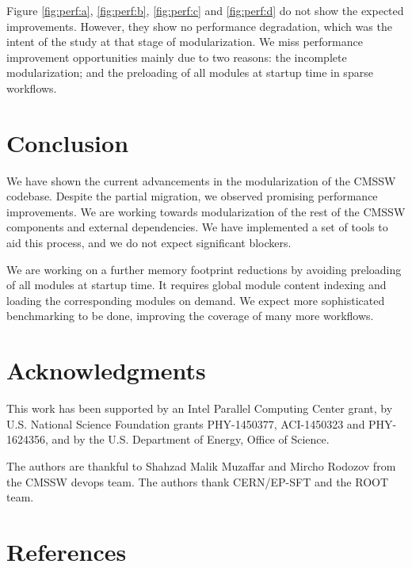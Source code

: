 \documentclass[12pt]{iopart}
\begin{document}
Figure \ref{fig:perf:a}, \ref{fig:perf:b}, \ref{fig:perf:c} and \ref{fig:perf:d} do not show the expected improvements. However, they show no performance degradation, which was the intent of the study at that stage of modularization. We miss performance improvement opportunities mainly due to two reasons: the incomplete modularization; and the preloading of all modules at startup time in sparse workflows.

\section{Conclusion}
We have shown the current advancements in the modularization of the CMSSW codebase. Despite the partial migration, we observed promising performance improvements. We are working towards modularization of the rest of the CMSSW components and external dependencies. We have implemented a set of tools to aid this process, and we do not expect significant blockers.

We are working on a further memory footprint reductions by avoiding preloading of all modules at startup time. It requires global module content indexing and loading the corresponding modules on demand. We expect more sophisticated benchmarking to be done, improving the coverage of many more workflows.

\section{Acknowledgments}
\label{ack}

This work has been supported by an Intel Parallel Computing Center grant, by U.S. National Science Foundation grants PHY-1450377, ACI-1450323 and PHY-1624356, and by the U.S. Department of Energy, Office of Science.

The authors are thankful to Shahzad Malik Muzaffar and Mircho Rodozov from the CMSSW devops team. The authors thank CERN/EP-SFT and the ROOT team.


\section*{References}
\end{document}
